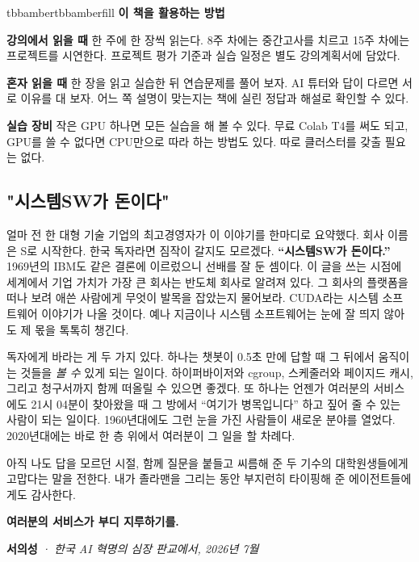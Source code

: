 \vspace{1.0pt}

\begin{calloutbox}{tbbamber}{tbbamberfill}
{\normalsize\bfseries\color{tbbamberdark}이 책을 활용하는 방법}\par\vspace{3pt}
\begin{tbbitemize}
  \item \textbf{강의에서 읽을 때} 한 주에 한 장씩 읽는다. 8주 차에는 중간고사를 치르고 15주 차에는 프로젝트를 시연한다. 프로젝트 평가 기준과 실습 일정은 별도 강의계획서에 담았다.
  \item \textbf{혼자 읽을 때} 한 장을 읽고 실습한 뒤 연습문제를 풀어 보자. AI 튜터와 답이 다르면 서로 이유를 대 보자. 어느 쪽 설명이 맞는지는 책에 실린 정답과 해설로 확인할 수 있다.
  \item \textbf{실습 장비} 작은 GPU 하나면 모든 실습을 해 볼 수 있다. 무료 Colab T4를 써도 되고, GPU를 쓸 수 없다면 CPU만으로 따라 하는 방법도 있다. 따로 클러스터를 갖출 필요는 없다.
\end{tbbitemize}
\end{calloutbox}

\vspace{1.5pt}

\subsection*{"시스템SW가 돈이다"}

얼마 전 한 대형 기술 기업의 최고경영자가 이 이야기를 한마디로 요약했다. 회사 이름은 S로 시작한다. 한국 독자라면 짐작이 갈지도 모르겠다. \textbf{“시스템SW가 돈이다.”} 1969년의 IBM도 같은 결론에 이르렀으니 선배를 잘 둔 셈이다. 이 글을 쓰는 시점에 세계에서 기업 가치가 가장 큰 회사는 반도체 회사로 알려져 있다. 그 회사의 플랫폼을 떠나 보려 애쓴 사람에게 무엇이 발목을 잡았는지 물어보라. CUDA라는 시스템 소프트웨어 이야기가 나올 것이다. 예나 지금이나 시스템 소프트웨어는 눈에 잘 띄지 않아도 제 몫을 톡톡히 챙긴다.

독자에게 바라는 게 두 가지 있다. 하나는 챗봇이 0.5초 만에 답할 때 그 뒤에서 움직이는 것들을 \textit{볼 수} 있게 되는 일이다. 하이퍼바이저와 cgroup, 스케줄러와 페이지드 캐시, 그리고 청구서까지 함께 떠올릴 수 있으면 좋겠다. 또 하나는 언젠가 여러분의 서비스에도 21시 04분이 찾아왔을 때 그 방에서 “여기가 병목입니다” 하고 짚어 줄 수 있는 사람이 되는 일이다. 1960년대에도 그런 눈을 가진 사람들이 새로운 분야를 열었다. 2020년대에는 바로 한 층 위에서 여러분이 그 일을 할 차례다.

아직 나도 답을 모르던 시절, 함께 질문을 붙들고 씨름해 준 두 기수의 대학원생들에게 고맙다는 말을 전한다. 내가 졸라맨을 그리는 동안 부지런히 타이핑해 준 에이전트들에게도 감사한다.

\textcolor{tbbink}{\textbf{여러분의 서비스가 부디 지루하기를.}}

{\raggedleft \textcolor{tbbink}{\textbf{서의성}}\textcolor{tbbgray}{\textit{  ·  한국 AI 혁명의 심장 판교에서, 2026년 7월}}\par}
